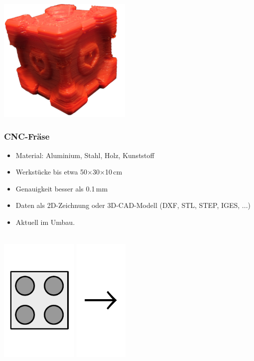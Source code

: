 \documentclass[t]{beamer}
\begin{document}
\begin{frame}
\begin{center}
        \includegraphics[height=6cm]{../img/companioncube.png}
    \end{center}
\end{frame}

\begin{frame}
    \frametitle{CNC-Fräse}
    \begin{itemize}
        \item Material: Aluminium, Stahl, Holz, Kunststoff
        \item Werkstücke bis etwa 50$\times$30$\times$10\,cm
        \item Genauigkeit besser als 0.1\,mm
        \item Daten als 2D-Zeichnung oder 3D-CAD-Modell (DXF, STL, STEP, IGES, ...)
        \item Aktuell im Umbau.
    \end{itemize}
    \begin{center}
    ~\\
    \includegraphics[height=6cm]{../img/legozeichnung.pdf}
    \includegraphics[height=6cm]{../img/pfeil.pdf}

\end{center}
\end{frame}
\end{document}
